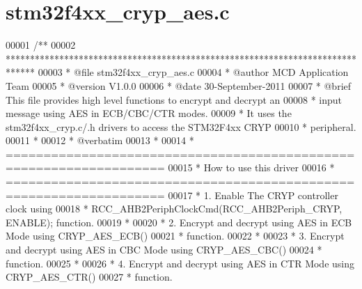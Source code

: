 \section{stm32f4xx\+\_\+cryp\+\_\+aes.\+c}
\label{stm32f4xx__cryp__aes_8c_source}

\begin{DoxyCode}
00001 \textcolor{comment}{/**}
00002 \textcolor{comment}{  ******************************************************************************}
00003 \textcolor{comment}{  * @file    stm32f4xx\_cryp\_aes.c}
00004 \textcolor{comment}{  * @author  MCD Application Team}
00005 \textcolor{comment}{  * @version V1.0.0}
00006 \textcolor{comment}{  * @date    30-September-2011}
00007 \textcolor{comment}{  * @brief   This file provides high level functions to encrypt and decrypt an }
00008 \textcolor{comment}{  *          input message using AES in ECB/CBC/CTR modes.}
00009 \textcolor{comment}{  *          It uses the stm32f4xx\_cryp.c/.h drivers to access the STM32F4xx CRYP}
00010 \textcolor{comment}{  *          peripheral.}
00011 \textcolor{comment}{  *}
00012 \textcolor{comment}{  *  @verbatim}
00013 \textcolor{comment}{  *}
00014 \textcolor{comment}{  *          ===================================================================}
00015 \textcolor{comment}{  *                                   How to use this driver}
00016 \textcolor{comment}{  *          ===================================================================}
00017 \textcolor{comment}{  *          1. Enable The CRYP controller clock using }
00018 \textcolor{comment}{  *            RCC\_AHB2PeriphClockCmd(RCC\_AHB2Periph\_CRYP, ENABLE); function.}
00019 \textcolor{comment}{  *}
00020 \textcolor{comment}{  *          2. Encrypt and decrypt using AES in ECB Mode using CRYP\_AES\_ECB()}
00021 \textcolor{comment}{  *             function.}
00022 \textcolor{comment}{  *}
00023 \textcolor{comment}{  *          3. Encrypt and decrypt using AES in CBC Mode using CRYP\_AES\_CBC()}
00024 \textcolor{comment}{  *             function.}
00025 \textcolor{comment}{  *}
00026 \textcolor{comment}{  *          4. Encrypt and decrypt using AES in CTR Mode using CRYP\_AES\_CTR()}
00027 \textcolor{comment}{  *             function.}

\end{DoxyCode}
